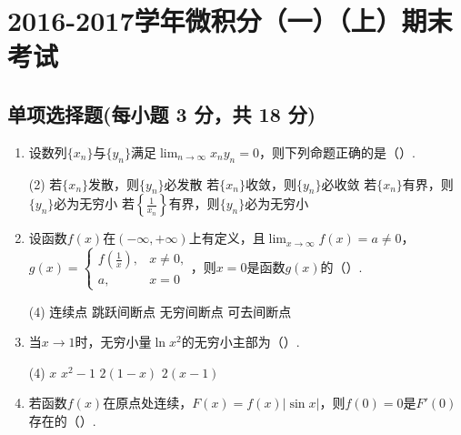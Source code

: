 \documentclass[../main.tex]{subfiles}
\begin{document}
\chapter{2016-2017学年微积分（一）（上）期末考试}

\section{单项选择题(每小题 3 分，共 18 分)}
\begin{enumerate}
    \item 设数列$\{x_{n}\}$与$\{y_{n}\}$满足$\lim_{n\to\infty}x_{n} y_{n}=0$，则下列命题正确的是（\qquad）.

          \begin{tasks}[label=\textbf{\Alph*.}, label-width=1.5em, column-sep=1em](2)
              \task 若$\{x_{n}\}$发散，则$\{y_{n}\}$必发散
              \task 若$\{x_{n}\}$收敛，则$\{y_{n}\}$必收敛
              \task 若$\{x_{n}\}$有界，则$\{y_{n}\}$必为无穷小
              \task 若$\left\{\frac{1}{x_{n}}\right\}$有界，则$\{y_{n}\}$必为无穷小
          \end{tasks}

    \item 设函数$f(x)$在$(-\infty,+\infty)$上有定义，且$\lim_{x\to\infty}f(x)=a\neq
              0$，$g(x)=
              \begin{cases}
                  f\left(\frac{1}{x}\right), & x\neq0, \\
                  a,                         & x=0
              \end{cases}$，则$x=0$是函数$g(x)$的（\qquad）.

          \begin{tasks}[label=\textbf{\Alph*.}, label-width=1.5em, column-sep=1em](4)
              \task 连续点
              \task 跳跃间断点
              \task 无穷间断点
              \task 可去间断点
          \end{tasks}

    \item 当$x\to1$时，无穷小量$\ln x^{2}$的无穷小主部为（\qquad）.

          \begin{tasks}[label=\textbf{\Alph*.}, label-width=1.5em, column-sep=1em](4)
              \task $x$
              \task $x^{2}-1$
              \task $2(1-x)$
              \task $2(x-1)$
          \end{tasks}

    \item 若函数$f(x)$在原点处连续，$F(x)=f(x)|\sin x|$，则$f(0)=0$是$F'(0)$存在的（\qquad）.


\end{enumerate}
\end{document}
